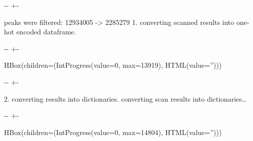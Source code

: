 \documentclass[letterpaper,10pt,english]{sphinxmanual}
\newlength\nbsphinxcodecellspacing
\begin{document}
{

\kern-\sphinxverbatimsmallskipamount\kern-\baselineskip
\kern+\FrameHeightAdjust\kern-\fboxrule
\vspace{\nbsphinxcodecellspacing}

\begin{sphinxVerbatim}[commandchars=\\\{\}]
peaks were filtered: 12934005 -> 2285279
1. converting scanned results into one-hot encoded dataframe.
\end{sphinxVerbatim}
}

{

\kern-\sphinxverbatimsmallskipamount\kern-\baselineskip
\kern+\FrameHeightAdjust\kern-\fboxrule
\vspace{\nbsphinxcodecellspacing}

\begin{sphinxVerbatim}[commandchars=\\\{\}]
HBox(children=(IntProgress(value=0, max=13919), HTML(value='')))
\end{sphinxVerbatim}
}

{

\kern-\sphinxverbatimsmallskipamount\kern-\baselineskip
\kern+\FrameHeightAdjust\kern-\fboxrule
\vspace{\nbsphinxcodecellspacing}

\begin{sphinxVerbatim}[commandchars=\\\{\}]

2. converting results into dictionaries.
converting scan results into dictionaries{\ldots}
\end{sphinxVerbatim}
}

{

\kern-\sphinxverbatimsmallskipamount\kern-\baselineskip
\kern+\FrameHeightAdjust\kern-\fboxrule
\vspace{\nbsphinxcodecellspacing}

\begin{sphinxVerbatim}[commandchars=\\\{\}]
HBox(children=(IntProgress(value=0, max=14804), HTML(value='')))
\end{sphinxVerbatim}
}
\end{document}
